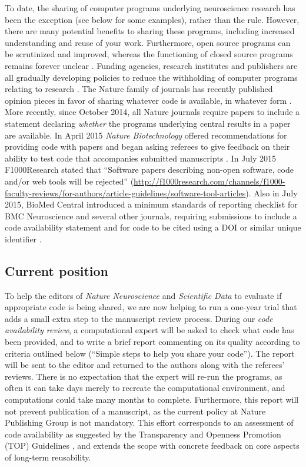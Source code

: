 \documentclass[11pt]{article}
\begin{document}
To date, the sharing of computer programs underlying neuroscience
research has been the exception (see below for some examples), rather
than the rule.  However, there are many potential benefits to sharing
these programs, including increased understanding and reuse of your
work.  Furthermore, open source programs can be scrutinized and
improved, whereas the functioning of closed source programs remains
forever unclear \cite{Vihinen2015}.  Funding agencies, research
institutes and publishers are all gradually developing policies to
reduce the withholding of computer programs relating to research
\cite{Morin2012-65e}.  The Nature family of journals has recently
published opinion pieces in favor of sharing whatever code is
available, in whatever form \cite{Barnes2010-iv,Ince2012-225}.  More
recently, since October 2014, all Nature journals require papers to
include a statement declaring \textit{whether} the programs underlying
central results in a paper are available. In April 2015 \textit{Nature
  Biotechnology} offered recommendations for providing code with
papers and began asking referees to give feedback on their ability to
test code that accompanies submitted manuscripts
\cite{NatBiotech2015}.  In July 2015 F1000Research stated that
``Software papers describing non-open software, code and/or web tools
will be rejected''
(\url{http://f1000research.com/channels/f1000-faculty-reviews/for-authors/article-guidelines/software-tool-articles}). Also
in July 2015, BioMed Central introduced a minimum standards of
reporting checklist for BMC Neuroscience and several other journals,
requiring submissions to include a code availability statement and for
code to be cited using a DOI or similar unique identifier
\cite{Kenall2015}.

\subsection*{Current position}

To help the editors of \textit{Nature Neuroscience} and
\textit{Scientific Data} to evaluate if appropriate code is being
shared, we are now helping to run a one-year trial that adds a small
extra step to the manuscript review process.  During our \textit{code
  availability review}, a computational expert will be asked to check
what code has been provided, and to write a brief report commenting on
its quality according to criteria outlined below (``Simple steps to
help you share your code'').  The report will be sent to the editor
and returned to the authors along with the referees' reviews. There is
no expectation that the expert will re-run the programs, as often it
can take days merely to recreate the computational environment, and
computations could take many months to complete.  Furthermore, this
report will not prevent publication of a manuscript, as the current
policy at Nature Publishing Group is not mandatory.  This effort
corresponds to an assessment of code availability as suggested by the
Transparency and Openness Promotion (TOP) Guidelines \cite{Nosek2015},
and extends the scope with concrete feedback on core aspects of
long-term reusability.
\end{document}
